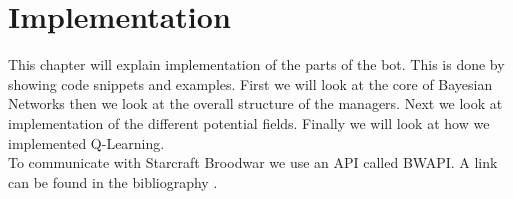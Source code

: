 \chapter{Implementation}
This chapter will explain implementation of the parts of the bot. This is done by showing code snippets and examples. First we will look at the core of Bayesian Networks then we look at the overall structure of the managers. Next we look at implementation of the different potential fields. Finally we will look at how we implemented Q-Learning.\\

To communicate with Starcraft Broodwar we use an API called BWAPI. A link can be found in the bibliography \cite{bwapi}.


	
	
	
	